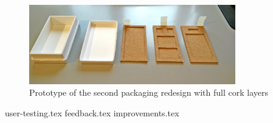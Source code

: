 \documentclass[final,a4paper]{report} %
\begin{document}
	\begin{figure}[H]
		\centering
		\includegraphics[width=0.8\textwidth]{resources/BoxPrototype23}
		\caption{Prototype of the second packaging redesign with full cork layers}
		\label{fig:Prototype of box design 2 with full cork exterior}
	\end{figure}  

	{user-testing.tex}
	{feedback.tex}
	{improvements.tex}
\end{document}
